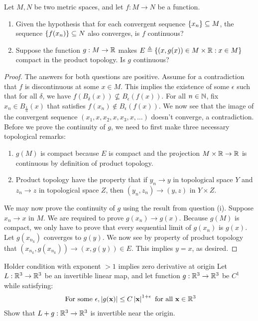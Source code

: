 \documentclass{report}
\begin{document}
\begin{question}{}{}
Let $M,N$ be two metric spaces, and let $f:M\rightarrow N$ be a function. 
 \begin{enumerate}[label=(\roman*)]
  \item Given the hypothesis that for each convergent sequence $\left\{ x_n \right\}\subseteq M$, the sequence $\left\{ f(x_n) \right\}\subseteq N$ also converges, is $f$ continuous? 
  \item Suppose the function $g:M\rightarrow \mathbb{R}$ makes $E\triangleq \left\{ (x,g(x))\in M\times \mathbb{R}:x\in M \right\}$ compact in the product topology. Is $g$ continuous? 
\end{enumerate}
\end{question}
\begin{proof}
The answers for both questions are positive. Assume for a contradiction that $f$ is discontinuous at some $x \in M$. This implies the existence of some $\epsilon $ such that for all $\delta$, we have $f(B_\delta(x))\not \subseteq B_\epsilon (f(x))$. For all $n\in\mathbb{N}$, fix $x_n \in B_{\frac{1}{n}}(x)$ that satisfies $f(x_n)\not\in B_\epsilon (f(x))$. We now see that the image of the convergent sequence $(x_1,x,x_2,x,x_3,x,\dots) $  doesn't converge, a contradiction.\\

Before we prove the continuity of $g$, we need to first make three necessary topological remarks: 
 \begin{enumerate}[label=(\alph*)]
  \item $g(M)$ is compact because $E$ is compact and the projection $M\times \mathbb{R}\rightarrow \mathbb{R}$ is continuous by definition of product topology.   
  \item Product topology have the property that if $y_n \rightarrow y$ in topological space $Y$ and  $z_n \rightarrow z$ in topological space $Z$, then $(y_n,z_n)\rightarrow (y,z)$ in $Y\times Z$. 
\end{enumerate}
We may now prove the continuity of $g$ using the result from question (i). Suppose $x_n\rightarrow x$ in $M$. We are required to prove $g(x_n)\rightarrow g(x)$. Because $g(M)$ is compact, we only have to prove that every sequential limit of $g(x_n)$ is $g(x)$. Let $g(x_{n_k})$ converges to $g(y)$. We now see by property of product topology that $(x_{n_k},g(x_{n_k}))\rightarrow (x,g(y)) \in E$. This implies $y=x$, as desired.   
\end{proof}
\begin{question}{Holder condition with exponent $>1$ implies zero derivative at origin}{}
Let $L:\mathbb{R}^3 \rightarrow \mathbb{R}^3$ be an invertible linear map, and let function $g:\mathbb{R}^3 \rightarrow \mathbb{R}^3$ be $C^1$ while satisfying: 
 \begin{align*}
\text{ For some }\epsilon ,\left|g(\textbf{x})\right|\leq C \left|\textbf{x}\right|^{1+\epsilon }\text{ for all }\textbf{x}\in\mathbb{R}^3
\end{align*}
Show that $L+g:\mathbb{R}^3 \rightarrow \mathbb{R}^3$ is invertible near the origin.  
\end{question}
\end{document}
